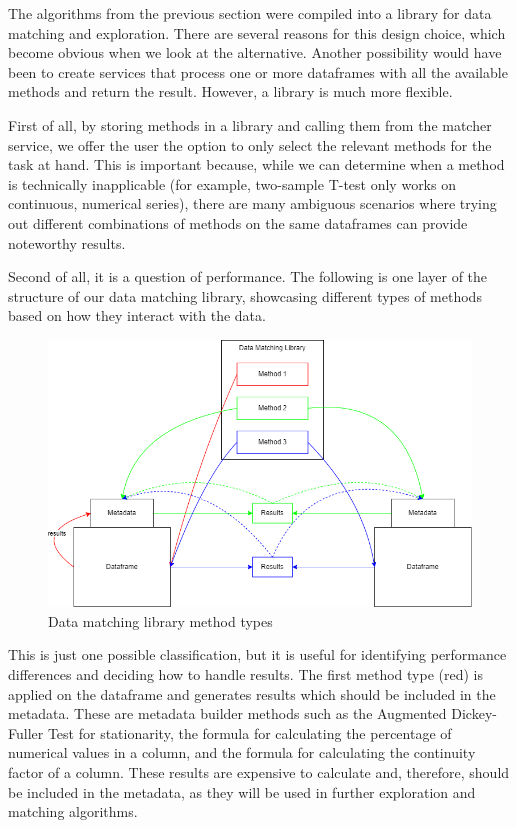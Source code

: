 The algorithms from the previous section were compiled into a library for data matching and exploration.
There are several reasons for this design choice, which become obvious when we look at the alternative.
Another possibility would have been to create services that process one or more dataframes with all the available methods
and return the result.
However, a library is much more flexible.

First of all, by storing methods in a library and calling them from the matcher service, we offer the user the option to
only select the relevant methods for the task at hand.
This is important because, while we can determine when a method is technically inapplicable (for example, two-sample T-test
only works on continuous, numerical series), there are many ambiguous scenarios where trying out different combinations of
methods on the same dataframes can provide noteworthy results.

Second of all, it is a question of performance.
The following is one layer of the structure of our data matching library, showcasing different types of methods based on
how they interact with the data.

\begin{figure}[h]
    \centering
    \includegraphics[width=12cm]{figures/data_matching_library/data_matching_library}
    \caption{Data matching library method types}
    \label{fig:data_mathicng_library_doc_1}
\end{figure}

This is just one possible classification, but it is useful for identifying performance differences and deciding how to
handle results.
The first method type (red) is applied on the dataframe and generates results which should be included in the metadata.
These are metadata builder methods such as the Augmented Dickey-Fuller Test for stationarity, the formula for calculating
the percentage of numerical values in a column, and the formula for calculating the continuity factor of a column.
These results are expensive to calculate and, therefore, should be included in the metadata, as they will be used in further
exploration and matching algorithms.

